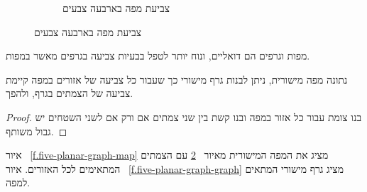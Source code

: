 \begin{figure}[tb]
\begin{center}
\begin{subfigure}{.4\textwidth}
\caption{צביעת מפה בארבעה צבעים}\label{f.five-planar-map-four}
\end{subfigure}
\end{center}
\end{figure}
מפות וגרפים הם דואליים, ונוח יותר לטפל בבעיות צביעה בגרפים מאשר במפות.
\begin{theorem}
נתונה מפה מישורית, ניתן לבנות גרף מישורי כך שעבור כל צביעה של אזורים במפה קיימת צביעה של הצמתים בגרף, ולהפך.
\end{theorem}

\begin{proof}
בנו צומת עבור כל אזור במפה ובנו קשת בין שני צמתים אם ורק אם לשני השטחים יש גבול משותף.
\end{proof}
\begin{example}
איור%
~\ref{f.five-planar-graph-map}
מציג את המפה המישורית מאיור%
~\ref{f.five-planar-map-four}
עם הצמתים המתאימים לכל האזורים. איור%
~\ref{f.five-planar-graph-graph}
מציג גרף מישורי המתאים למפה.
\end{example}

